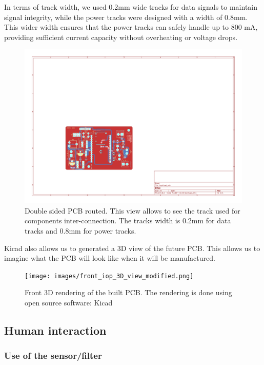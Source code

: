 In terms of track width, we used 0.2mm wide tracks for data signals to maintain signal integrity, while the power tracks were designed with a width of 0.8mm. This wider width ensures that the power tracks can safely handle up to 800 mA, providing sufficient current capacity without overheating or voltage drops.

\begin{figure}[H]
    \centering
    \includegraphics[width=\textwidth]{images/iop-routed_pcb.pdf}
    \caption{Double sided PCB routed. This view allows to see the track used for components inter-connection. The tracks width is 0.2mm for data tracks and 0.8mm for power tracks.}
    \vspace{0.1cm}
    \label{fig:iop_routed_pcb}
\end{figure}

Kicad also allows us to generated a 3D view of the future PCB. This allows us to imagine what the
PCB will look like when it will be manufactured.
\begin{figure}[H]
    \centering
    \texttt{[image: images/front\_iop\_3D\_view\_modified.png]}
    \caption{Front 3D rendering of the built PCB. The rendering is done using open source software: Kicad}
    \vspace{0.1cm}
    \label{fig:front_iop_3D_view_modified}
\end{figure}

\subsection{Human interaction}

\subsubsection{Use of the sensor/filter}

